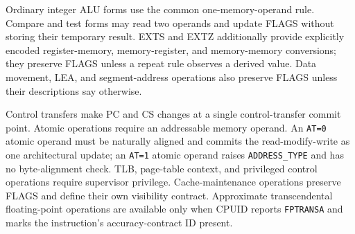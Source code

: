 Ordinary integer ALU forms use the common one-memory-operand rule. Compare and test forms may read two operands and
update FLAGS without storing their temporary result. EXTS and EXTZ additionally provide explicitly encoded
register-memory, memory-register, and memory-memory conversions; they preserve FLAGS unless a repeat rule observes a
derived value. Data movement, LEA, and segment-address operations also preserve FLAGS unless their descriptions say
otherwise.

Control transfers make PC and CS changes at a single control-transfer commit point. Atomic operations require an
addressable memory operand. An \texttt{AT=0} atomic operand must be naturally aligned and commits the
read-modify-write as one architectural update; an \texttt{AT=1} atomic operand raises \texttt{ADDRESS\_TYPE} and has
no byte-alignment check. TLB,
page-table context, and privileged control operations require supervisor privilege. Cache-maintenance operations
preserve FLAGS and define their own visibility contract. Approximate transcendental floating-point operations are
available only when CPUID reports \texttt{FPTRANSA} and marks the instruction's accuracy-contract ID present.
